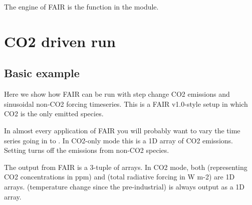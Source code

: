 \documentclass[letterpaper,10pt,english]{sphinxmanual}
\begin{document}
The \sphinxquotedblleft{}engine\sphinxquotedblright{} of FAIR is the  function in the 
module.

\begin{sphinxVerbatim}[commandchars=\\\{\}]
   
\end{sphinxVerbatim}


\section{CO2 driven run}
\label{\detokenize{examples:co2-driven-run}}

\subsection{Basic example}
\label{\detokenize{examples:basic-example}}
Here we show how FAIR can be run with step change CO2 emissions and
sinusoidal non-CO2 forcing timeseries. This is a FAIR v1.0-style setup
in which CO2 is the only emitted species.

In almost every application of FAIR you will probably want to vary the
 time series going in to . In CO2-only mode
this is a 1D array of CO2 emissions. Setting  turns
off the emissions from non-CO2 species.

The output from FAIR is a 3-tuple of  arrays. In CO2 mode,
both  (representing CO2 concentrations in ppm) and  (total
radiative forcing in W m-2) are 1D arrays.  (temperature change
since the pre-industrial) is always output as a 1D array.
\end{document}
